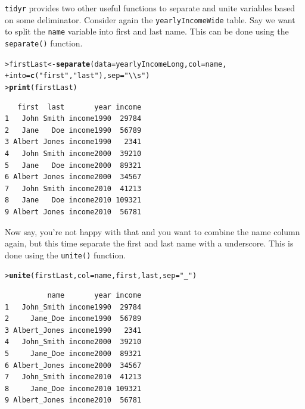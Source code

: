 \documentclass[12pt,oneside]{book}\usepackage[]{graphicx}\usepackage[]{color}
\makeatletter
\newcommand{\hlstr}[1]{\textcolor[rgb]{0.192,0.494,0.8}{#1}}%
\newcommand{\hlstd}[1]{\textcolor[rgb]{0.345,0.345,0.345}{#1}}%
\newcommand{\hlkwb}[1]{\textcolor[rgb]{0.69,0.353,0.396}{#1}}%
\newcommand{\hlkwc}[1]{\textcolor[rgb]{0.333,0.667,0.333}{#1}}%
\newcommand{\hlkwd}[1]{\textcolor[rgb]{0.737,0.353,0.396}{\textbf{#1}}}%
\newenvironment{kframe}{%
 \def\at@end@of@kframe{}%
 \ifinner\ifhmode%
  \def\at@end@of@kframe{\end{minipage}}%
  \begin{minipage}{\columnwidth}%
 \fi\fi%
 \def\FrameCommand##1{\hskip\@totalleftmargin \hskip-\fboxsep
 \colorbox{shadecolor}{##1}\hskip-\fboxsep
     \hskip-\linewidth \hskip-\@totalleftmargin \hskip\columnwidth}%
 \MakeFramed {\advance\hsize-\width
   \@totalleftmargin\z@ \linewidth\hsize
   \@setminipage}}%
 {\par\unskip\endMakeFramed%
 \at@end@of@kframe}
\newenvironment{knitrout}{}{} %
\makeatother
\begin{document}
\verb+tidyr+ provides two other useful functions to separate and unite variables based on some deliminator. Consider again the \verb+yearlyIncomeWide+ table. Say we want to split the \verb+name+ variable into first and last name. This can be done using the \verb+separate()+ function.
\begin{knitrout}
\color{fgcolor}\begin{kframe}
\begin{alltt}
\hlstd{> }\hlstd{firstLast} \hlkwb{<-} \hlkwd{separate}\hlstd{(}\hlkwc{data} \hlstd{= yearlyIncomeLong,} \hlkwc{col} \hlstd{= name,}
\hlstd{+ }                      \hlkwc{into} \hlstd{=} \hlkwd{c}\hlstd{(}\hlstr{"first"}\hlstd{,} \hlstr{"last"}\hlstd{),} \hlkwc{sep}\hlstd{=}\hlstr{"\textbackslash{}\textbackslash{}s"}\hlstd{)}
\hlstd{> }\hlkwd{print}\hlstd{(firstLast)}
\end{alltt}
\begin{verbatim}
   first  last       year income
1   John Smith income1990  29784
2   Jane   Doe income1990  56789
3 Albert Jones income1990   2341
4   John Smith income2000  39210
5   Jane   Doe income2000  89321
6 Albert Jones income2000  34567
7   John Smith income2010  41213
8   Jane   Doe income2010 109321
9 Albert Jones income2010  56781
\end{verbatim}
\end{kframe}
\end{knitrout}
Now say, you're not happy with that and you want to combine the name column again, but this time separate the first and last name with a underscore. This is done using the \verb+unite()+ function.
\begin{knitrout}
\color{fgcolor}\begin{kframe}
\begin{alltt}
\hlstd{> }\hlkwd{unite}\hlstd{(firstLast,} \hlkwc{col} \hlstd{= name, first, last,} \hlkwc{sep} \hlstd{=} \hlstr{"_"}\hlstd{)}
\end{alltt}
\begin{verbatim}
          name       year income
1   John_Smith income1990  29784
2     Jane_Doe income1990  56789
3 Albert_Jones income1990   2341
4   John_Smith income2000  39210
5     Jane_Doe income2000  89321
6 Albert_Jones income2000  34567
7   John_Smith income2010  41213
8     Jane_Doe income2010 109321
9 Albert_Jones income2010  56781
\end{verbatim}
\end{kframe}
\end{knitrout}
\end{document}
